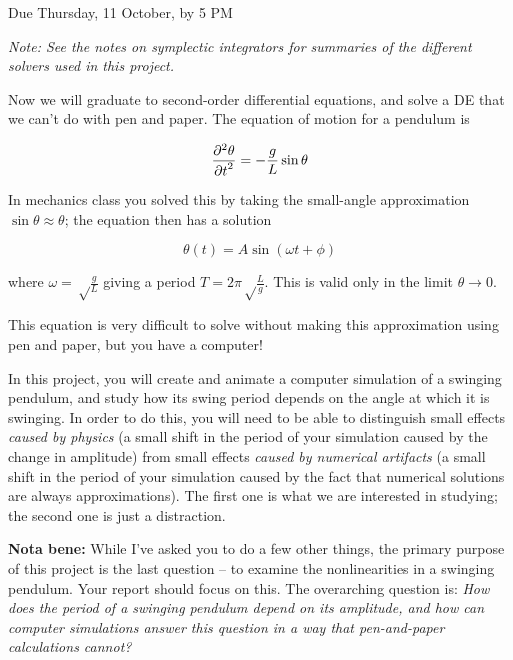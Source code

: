 \documentclass[12pt]{article}
\def\PARTWO#1#2{ {{\partial^2 #1}\over{\partial #2}^2} }
\begin{document}
\Large
\centerline{}
\centerline{Due Thursday, 11 October, by 5 PM}
\normalsize


\begin{center}
\it Note: See the notes on symplectic integrators for summaries of the different solvers used in this project.
\end{center}

Now we will graduate to second-order differential equations, and solve a DE that we can't do with pen and paper. The equation of motion for a pendulum is

\begin{equation}
\PARTWO{\theta}{t}=-\frac{g}{L} \sin \theta
\end{equation}

In mechanics class you solved this by taking the small-angle approximation $\sin \theta \approx \theta$; the equation then has a solution

\begin{equation}
\theta(t) = A \sin (\omega t + \phi)
\end{equation}

where $\omega=\sqrt\frac{g}{L}$ giving a period $T=2\pi\sqrt\frac{L}{g}$. This is valid only in the limit $\theta \rightarrow 0$.

This equation is very difficult to solve without making this approximation using pen and paper, but you have a computer! 

In this project, you will create and animate a computer simulation of a swinging pendulum, and study how its swing period depends on the angle at which it is swinging.
In order to do this, you will need to be able to distinguish small effects {\it caused by physics} (a small shift in the period of your simulation caused by the change in
amplitude) from small effects {\it caused by numerical artifacts} (a small shift in the period of your simulation caused by the fact that numerical solutions are always
approximations). The first one is what we are interested in studying; the second one is just a distraction.

{\bf Nota bene:} While I've asked you to do a few other things, the primary purpose of this project is the last question -- to examine the nonlinearities in a swinging pendulum. Your report should focus on this. 
The overarching question is: {\it How does the period of a swinging pendulum depend on its amplitude, and how can computer simulations answer this question in a way that pen-and-paper calculations cannot?} 
\end{document}
